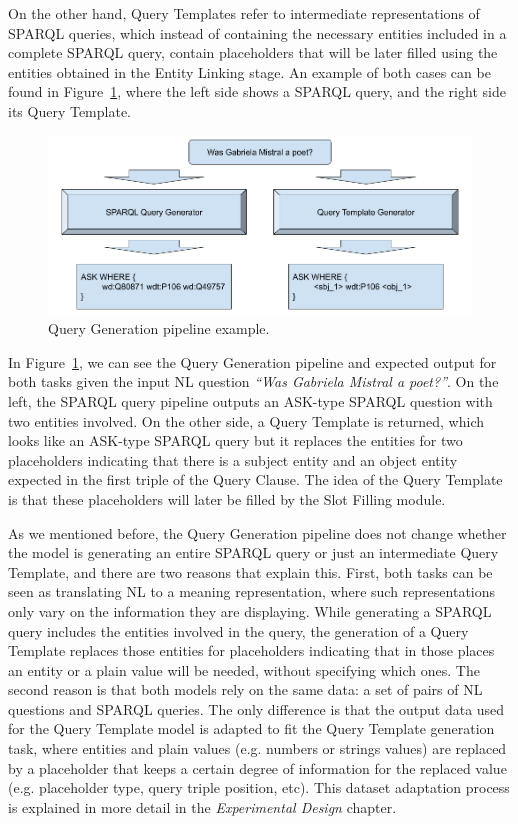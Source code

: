 On the other hand, Query Templates refer to intermediate representations of SPARQL queries, 
which instead of containing the necessary entities included in a complete SPARQL query, 
contain placeholders that will be later filled using the entities obtained in the Entity 
Linking stage. An example of both cases can be found in Figure~\ref{fig:queryGenerationOverview}, 
where the left side shows a SPARQL query, and the right side its Query Template. 

\begin{figure}[!h]
    \centering
    \includegraphics[scale=.45]{imagenes/3_system_overview/queryGenerationPipeline.png}
    \caption{Query Generation pipeline example.}
    \label{fig:queryGenerationOverview}
\end{figure}

In Figure~\ref{fig:queryGenerationOverview}, we can see the Query Generation pipeline and 
expected output for both tasks given the input NL question \textit{“Was Gabriela Mistral a 
poet?”}. On the left, the SPARQL query pipeline outputs an ASK-type SPARQL question with two 
entities involved. On the other side, a Query Template is returned, which looks like an 
ASK-type SPARQL query but it replaces the entities for two placeholders indicating that there 
is a subject entity and an object entity expected in the first triple of the Query Clause. 
The idea of the Query Template is that these placeholders will later be filled by the Slot 
Filling module.

As we mentioned before, the Query Generation pipeline does not change whether the model is 
generating an entire SPARQL query or just an intermediate Query Template, and there are two 
reasons that explain this. First, both tasks can be seen as translating NL to a meaning 
representation, where such representations only vary on the information they are displaying. 
While generating a SPARQL query includes the entities involved in the query, the generation 
of a Query Template replaces those entities for placeholders indicating that in those places 
an entity or a plain value will be needed, without specifying which ones. The second reason 
is that both models rely on the same data: a set of pairs of NL questions and SPARQL queries. 
The only difference is that the output data used for the Query Template model is adapted to 
fit the Query Template generation task, where entities and plain values (e.g. numbers or 
strings values) are replaced by a placeholder that keeps a certain degree of information for 
the replaced value (e.g. placeholder type, query triple position, etc). This dataset 
adaptation process is explained in more detail in the \textit{Experimental Design} chapter.


